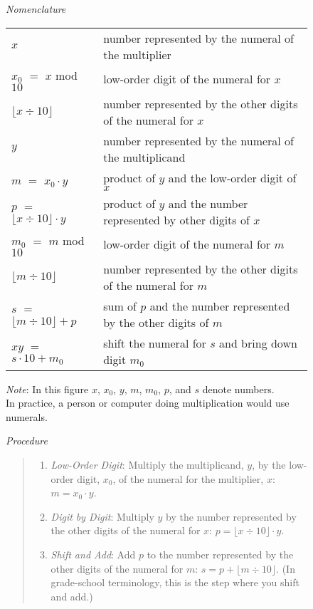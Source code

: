 \begin{figure}
\emph{Nomenclature}
\begin{center}
\begin{tabular}{ll}
$x$                         &number represented by the numeral of the multiplier\\
$x_0$ $=$ $x$ mod $10$      &low-order digit of the numeral for $x$\\
$\lfloor x\div 10\rfloor$   &number represented by the other digits of the numeral for $x$\\
$y$                         &number represented by the numeral of the multiplicand\\
$m$   $=$ $x_0\cdot y$      &product of $y$ and the low-order digit of $x$\\
$p$   $=$ $\lfloor x\div 10\rfloor\cdot y$ &product of $y$ and the number represented by other digits of $x$\\
$m_0$ $=$ $m$ mod $10$      &low-order digit of the numeral for $m$\\
$\lfloor m\div 10\rfloor$   &number represented by the other digits of the numeral for $m$\\
$s$   $=$ $\lfloor m\div 10\rfloor + p$    &sum of $p$ and the number represented by the other digits of $m$\\
$x y$ $=$ $s\cdot 10 + m_0$ &shift the numeral for $s$ and bring down digit $m_0$\\
\end{tabular}
\end{center}
\hspace*{1cm}\emph{Note}: In this figure $x$, $x_0$, $y$, $m$, $m_0$, $p$, and $s$ denote numbers.\\
\hspace*{1cm}In practice, a person or computer doing multiplication would use numerals.

\emph{Procedure}
\begin{quote}
\begin{enumerate}
\item \emph{Low-Order Digit}:
Multiply the multiplicand, $y$, by the low-order digit, $x_0$,
of the numeral for the multiplier, $x$: $m = x_0\cdot y$.

\item \emph{Digit by Digit}:
Multiply $y$ by the number
represented by the other digits of the numeral for $x$:
$p=\lfloor x\div 10\rfloor\cdot y$.

\item \emph{Shift and Add}:
Add $p$ to the number represented by
the other digits of the numeral for $m$: $s = p + \lfloor m\div 10\rfloor$.
(In grade-school terminology, this is the step where you
shift and add.)


\end{enumerate}
\end{quote}
\end{figure}
